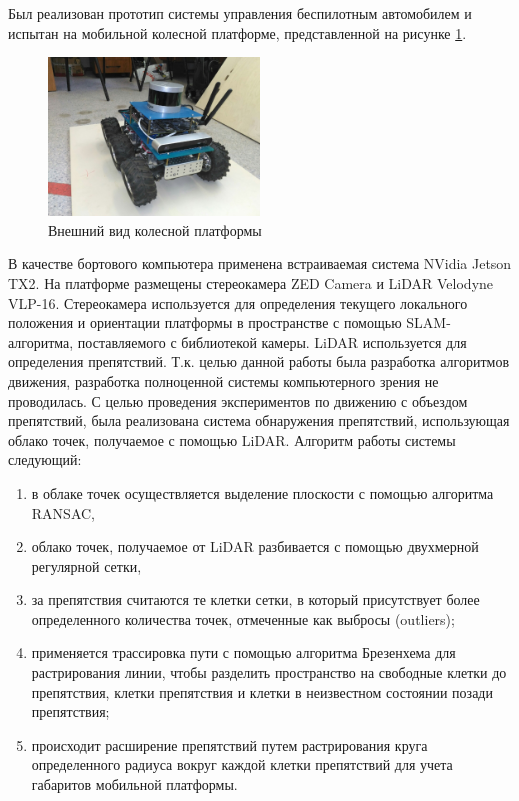 Был реализован прототип системы управления беспилотным автомобилем и испытан на мобильной
колесной платформе, представленной на рисунке \ref{img:car}.

\begin{figure}[h]
    \centering
    \includegraphics[width=0.5\textwidth]{images/car}
    \caption{Внешний вид колесной платформы}
    \label{img:car}
\end{figure}

В качестве бортового компьютера применена встраиваемая система NVidia Jetson TX2. На платформе размещены
стереокамера ZED Camera и LiDAR Velodyne VLP-16. Стереокамера используется для определения текущего локального
положения и ориентации платформы в пространстве с помощью SLAM-алгоритма, поставляемого с библиотекой
камеры. LiDAR используется для определения препятствий. Т.к. целью данной работы была разработка алгоритмов
движения, разработка полноценной системы компьютерного зрения не проводилась. С целью проведения экспериментов
по движению с объездом препятствий, была реализована система обнаружения препятствий, использующая облако
точек, получаемое с помощью LiDAR. Алгоритм работы системы следующий:
\begin{enumerate}
    \item в облаке точек осуществляется выделение плоскости с помощью алгоритма RANSAC,
    \item облако точек, получаемое от LiDAR разбивается с помощью двухмерной регулярной сетки,
    \item за препятствия считаются те клетки сетки, в который присутствует более определенного
          количества точек, отмеченные как выбросы (outliers);
    \item применяется трассировка пути с помощью алгоритма Брезенхема для растрирования линии, чтобы
          разделить пространство на свободные клетки до препятствия, клетки препятствия и клетки в неизвестном
          состоянии позади препятствия;
    \item происходит расширение препятствий путем растрирования круга определенного радиуса вокруг каждой
          клетки препятствий для учета габаритов мобильной платформы.
\end{enumerate}

